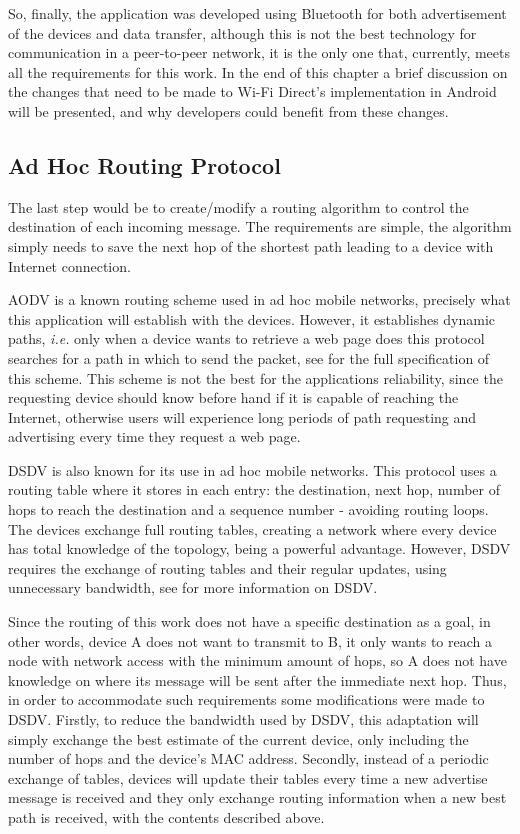 So, finally, the application was developed using Bluetooth for both advertisement of the devices and data transfer, although this is not the best technology for communication in a peer-to-peer network, it is the only one that, currently, meets all the requirements for this work. In the end of this chapter a brief discussion on the changes that need to be made to Wi-Fi Direct's implementation in Android will be presented, and why developers could benefit from these changes.

\subsection{Ad Hoc Routing Protocol}

The last step would be to create/modify a routing algorithm to control the destination of each incoming message. The requirements are simple, the algorithm simply needs to save the next hop of the shortest path leading to a device with Internet connection.

\gls{AODV} is a known routing scheme used in ad hoc mobile networks, precisely what this application will establish with the devices. However, it establishes dynamic paths, \textit{i.e.} only when a device wants to retrieve a web page does this protocol searches for a path in which to send the packet, see \cite{aodv} for the full specification of this scheme. This scheme is not the best for the applications reliability, since the requesting device should know before hand if it is capable of reaching the Internet, otherwise users will experience long periods of path requesting and advertising every time they request a web page.

\gls{DSDV} is also known for its use in ad hoc mobile networks. This protocol uses a routing table where it stores in each entry: the destination, next hop, number of hops to reach the destination and a sequence number - avoiding routing loops. The devices exchange full routing tables, creating a network where every device has total knowledge of the topology, being a powerful advantage. However, \gls{DSDV} requires the exchange of routing tables and their regular updates, using unnecessary bandwidth, see \cite{dsdv} for more information on \gls{DSDV}.

Since the routing of this work does not have a specific destination as a goal, in other words, device A does not want to transmit to B, it only wants to reach a node with network access with the minimum amount of hops, so A does not have knowledge on where its message will be sent after the immediate next hop. Thus, in order to accommodate such requirements some modifications were made to \gls{DSDV}. Firstly, to reduce the bandwidth used by \gls{DSDV}, this adaptation will simply exchange the best estimate of the current device, only including the number of hops and the device's \gls{MAC} address. Secondly, instead of a periodic exchange of tables, devices will update their tables every time a new advertise message is received and they only exchange routing information when a new best path is received, with the contents described above.

